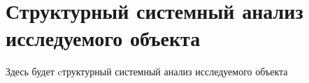 \renewcommand{\chaptertitle}{Структурный системный анализ исследуемого объекта}  %
\chapter{\chaptertitle}\label{ch:ch2}

Здесь будет cтруктурный системный анализ исследуемого объекта